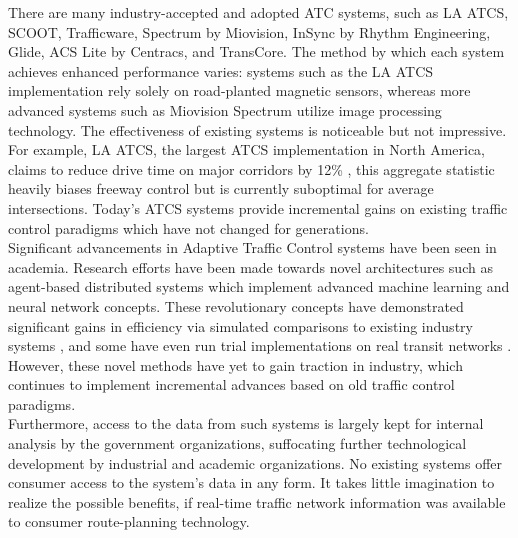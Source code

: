 \documentclass{article}
\begin{document}
There are many industry-accepted and adopted ATC systems, such as LA ATCS, SCOOT, Trafficware, Spectrum by Miovision, InSync by Rhythm Engineering, Glide, ACS Lite by Centracs, and TransCore.
The method by which each system achieves enhanced performance varies: systems such as the LA ATCS implementation rely solely on road-planted magnetic sensors, whereas more advanced systems such as Miovision Spectrum utilize image processing technology.
The effectiveness of existing systems is noticeable but not impressive.
For example, LA ATCS, the largest ATCS implementation in North America, claims to reduce drive time on major corridors by 12\% \cite{la-atcs-article}, this aggregate statistic heavily biases freeway control but is currently suboptimal for average intersections.
Today's ATCS systems provide incremental gains on existing traffic control paradigms which have not changed for generations.\\

Significant advancements in Adaptive Traffic Control systems have been seen in academia.
Research efforts have been made towards novel architectures such as agent-based distributed systems which implement advanced machine learning and neural network concepts.
These revolutionary concepts have demonstrated significant gains in efficiency via simulated comparisons to existing industry systems \cite{1688100, 5073360, uot-article}, and some have even run trial implementations on real transit networks \cite{uot-article}.
However, these novel methods have yet to gain traction in industry, which continues to implement incremental advances based on old traffic control paradigms.\\

Furthermore, access to the data from such systems is largely kept for internal analysis by the government organizations, suffocating further technological development by industrial and academic organizations.
No existing systems offer consumer access to the system's data in any form.
It takes little imagination to realize the possible benefits, if real-time traffic network information was available to consumer route-planning technology.\\
\end{document}
